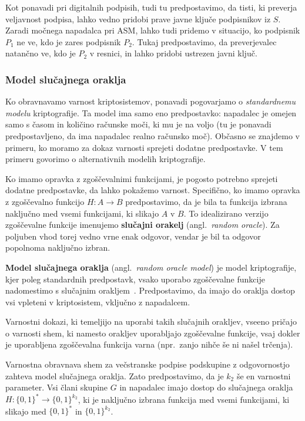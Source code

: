 \documentclass[isrm2, tisk]{fmfdelo}
\begin{document}
Kot ponavadi pri digitalnih podpisih, tudi tu predpostavimo, da tisti, ki preverja veljavnost podpisa, lahko vedno 
pridobi prave javne ključe podpisnikov iz $S$. Zaradi močnega napadalca pri ASM, lahko tudi pridemo 
v situacijo, ko podpisnik $P_1$ ne ve, kdo je zares podpisnik $P_2$. Tukaj predpostavimo, da preverjevalec
natančno ve, kdo je $P_2$ v resnici, in lahko pridobi ustrezen javni ključ. 

\subsubsection{Model slučajnega oraklja}
Ko obravnavamo varnost kriptosistemov, ponavadi pogovarjamo o \textit{standardnemu modelu} kriptografije. 
Ta model ima samo eno predpostavko: napadalec je omejen samo s časom in količino računske moči, ki mu 
je na voljo (tu je ponavadi predpostavljeno, da ima napadalec realno računsko moč). Občasno se znajdemo 
v primeru, ko moramo za dokaz varnosti sprejeti dodatne predpostavke. V tem primeru govorimo o 
alternativnih modelih kriptografije. 

Ko imamo opravka z zgoščevalnimi funkcijami, je pogosto potrebno sprejeti dodatne predpostavke, da lahko 
pokažemo varnost. Specifično, ko imamo opravka z zgoščevalno funkcijo $H: A \rightarrow B$ predpostavimo, 
da je bila ta funkcija izbrana naključno med vsemi funkcijami, ki slikajo $A$ v $B$. To idealizirano 
verzijo zgoščevalne funkcije imenujemo \textbf{slučajni orakelj} (angl.\ \textit{random oracle}).
Za poljuben vhod torej vedno vrne enak odgovor, vendar je bil ta odgovor popolnoma naključno izbran.

\textbf{Model slučajnega oraklja} (angl.\ \textit{random oracle model}) je model kriptografije, kjer poleg 
standardnih predpostavk, vsako uporabo zgoščevalne funkcije nadomestimo s slučajnim 
orakljem~\cite{boneh2023appcry}. Predpostavimo, da imajo do oraklja dostop vsi vpleteni v kriptosistem, 
vključno z napadalcem.

Varnostni dokazi, ki temeljijo na uporabi takih slučajnih orakljev, vseeno pričajo o varnosti shem,
ki namesto orakljev uporabljajo zgoščevalne funkcije, vsaj dokler je uporabljena zgoščevalna funkcija
varna (npr.\ zanjo nihče še ni našel trčenja).

\begin{definicija}
    Varnostna obravnava shem za večstranske podpise podskupine z odgovornostjo zahteva model slučajnega 
    oraklja. Zato predpostavimo, da je $k_2$ še en varnostni parameter. Vsi člani skupine $G$ in 
    napadalec imajo dostop do slučajnega oraklja $H: \{0, 1\}^* \rightarrow \{0, 1\}^{k_2}$, ki je 
    naključno izbrana funkcija med vsemi funkcijami, ki slikajo med $\{0, 1\}^*$ in $\{0, 1\}^{k_2}$.
\end{definicija}
\end{document}
